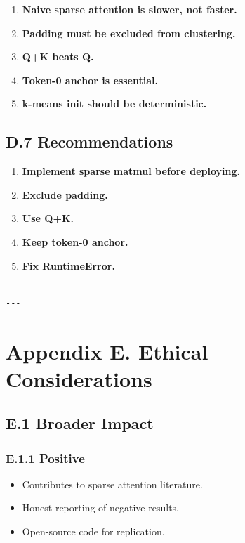 \begin{enumerate}
\item \textbf{Naive sparse attention is slower, not faster.}
\item \textbf{Padding must be excluded from clustering.}
\item \textbf{Q+K beats Q.}
\item \textbf{Token-0 anchor is essential.}
\item \textbf{k-means init should be deterministic.}

\end{enumerate}
\subsection{D.7 Recommendations}

\begin{enumerate}
\item \textbf{Implement sparse matmul before deploying.}
\item \textbf{Exclude padding.}
\item \textbf{Use Q+K.}
\item \textbf{Keep token-0 anchor.}
\item \textbf{Fix RuntimeError.}
\end{enumerate}
\begin{lstlisting}

---
\end{lstlisting}


\section{Appendix E. Ethical Considerations}

\subsection{E.1 Broader Impact}

\subsubsection{E.1.1 Positive}

\begin{itemize}
\item Contributes to sparse attention literature.
\item Honest reporting of negative results.
\item Open-source code for replication.

\end{itemize}
